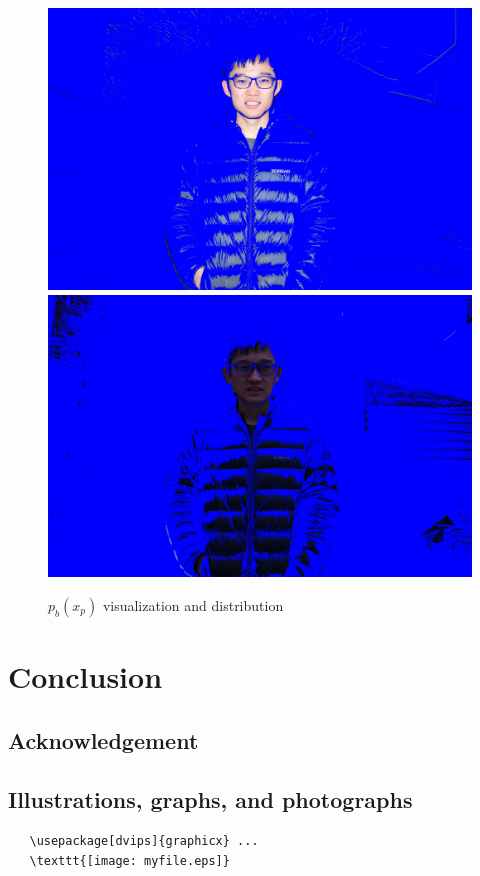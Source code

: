\documentclass[final]{cvpr}
\begin{document}
\begin{figure}[ht]
   \centering
   \includegraphics[scale=0.035]{../data/output/arthas_final_f_1.2_0.10_10_10.JPG}
   \includegraphics[scale=0.035]{../data/output/arthas_final_nf_1.2_0.10_10_10.JPG}
   \caption{$p_b(x_p)$ visualization and distribution}
\end{figure}

\newpage
\section{Conclusion}

\subsection{Acknowledgement}

\subsection{Illustrations, graphs, and photographs}
{\small\begin{verbatim}
   \usepackage[dvips]{graphicx} ...
   \texttt{[image: myfile.eps]}
\end{verbatim}
}

{\small


}
\end{document}
